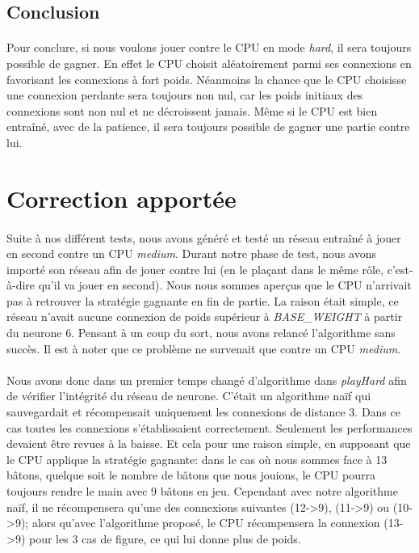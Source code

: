 \documentclass{article}
\begin{document}
  \subsection{Conclusion}
  \paragraph{}
    Pour conclure, si nous voulons jouer contre le CPU en mode \emph{hard}, il sera toujours possible de gagner.
    En effet le CPU choisit aléatoirement parmi ses connexions en favorisant les connexions à fort poids. 
    Néanmoins la chance que le CPU choisisse une connexion perdante sera toujours non nul, car les poids initiaux des connexions sont non nul et ne décroissent jamais. 
    Même si le CPU est bien entraîné, avec de la patience, il sera toujours possible de gagner une partie contre lui.


\newpage

\section{Correction apportée}
  \paragraph{}
    Suite à nos différent tests, nous avons généré et testé un réseau entraîné à jouer en second contre un CPU \emph{medium}.
    Durant notre phase de test, nous avons importé son réseau afin de jouer contre lui (en le plaçant dans le même rôle, c'est-à-dire qu'il va jouer en second).
    Nous nous sommes aperçus que le CPU n'arrivait pas à retrouver la stratégie gagnante en fin de partie. La raison était simple, ce réseau n'avait aucune 
    connexion de poids supérieur à \emph{BASE\_WEIGHT} à partir du neurone 6. Pensant à un coup du sort, nous avons relancé l'algorithme sans succès. Il est à noter
    que ce problème ne survenait que contre un CPU \emph{medium}.
  \paragraph{}
    Nous avons donc dans un premier temps changé d'algorithme dans \emph{playHard} afin de vérifier l'intégrité du réseau de neurone. C'était un algorithme naïf
    qui sauvegardait et récompensait uniquement les connexions de distance 3. Dans ce cas toutes les connexions s'établissaient correctement. Seulement 
    les performances devaient être revues à la baisse. Et cela pour une raison simple, en supposant que le CPU applique la stratégie gagnante: dans le cas où nous sommes 
    face à 13 bâtons, quelque soit le nombre de bâtons que nous jouions, le CPU pourra toujours rendre le main avec 9 bâtons en jeu. Cependant avec notre algorithme naïf, 
    il ne récompensera qu'une des connexions suivantes (12->9), (11->9) ou (10->9);
    alors qu'avec l'algorithme proposé, le CPU récompensera la connexion (13->9) pour les 3 cas de figure, ce qui lui donne plus de poids.
\end{document}
